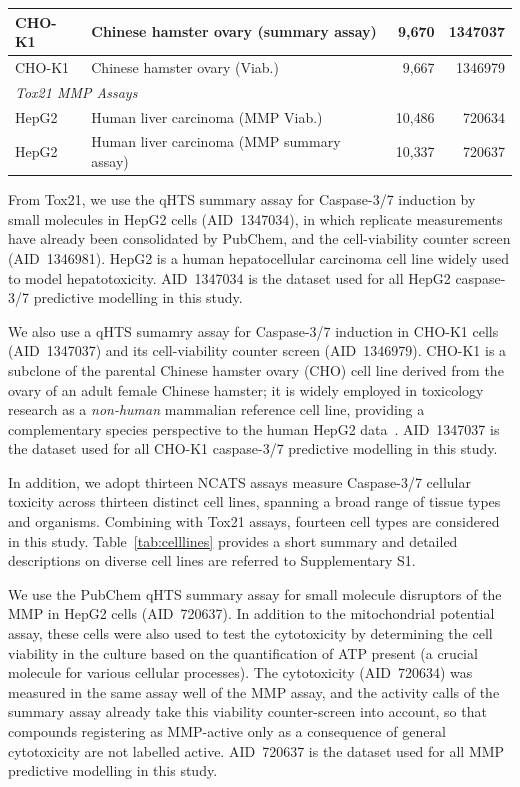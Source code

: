 \documentclass[letterpaper]{article}
\begin{document}
\begin{table}[t!]
\begin{tabular}{llrr}
CHO-K1 & Chinese hamster ovary (summary assay)         & 9{,}670 & 1347037 \\ \hline
CHO-K1 & Chinese hamster ovary (Viab.)                 & 9{,}667 & 1346979 \\[2pt]
\hline
\multicolumn{4}{l}{\textit{Tox21 MMP Assays}} \\
\hline
HepG2 & Human liver carcinoma (MMP Viab.)           & 10{,}486 & 720634 \\ \hline
HepG2 & Human liver carcinoma (MMP summary assay)  & 10{,}337 & 720637 \\
\hline
\end{tabular}
\end{table}

From Tox21, we use the qHTS summary assay for Caspase-3/7 induction by small molecules in HepG2 cells (AID~1347034), in which replicate measurements have already been consolidated by PubChem, and the cell-viability counter screen (AID~1346981). HepG2 is a human hepatocellular carcinoma cell line widely used to model hepatotoxicity. AID~1347034 is the dataset used for all HepG2 caspase-3/7 predictive modelling in this study.


We also use a qHTS sumamry assay for Caspase-3/7 induction in CHO-K1 cells
(AID~1347037) and its cell-viability counter screen (AID~1346979).
CHO-K1 is a subclone of the parental Chinese hamster ovary (CHO) cell
line derived from the ovary of an adult female Chinese hamster; it is
widely employed in toxicology research as a \emph{non-human} mammalian
reference cell line, providing a complementary species perspective to
the human HepG2 data~\cite{ATCC_CHOK1}. AID~1347037 is the dataset used for all CHO-K1 caspase-3/7 predictive modelling in this study.

In addition, we adopt thirteen NCATS assays measure Caspase-3/7 cellular toxicity across thirteen distinct cell lines, spanning a broad range of tissue types and organisms. Combining with Tox21 assays, fourteen cell types are considered in this study. Table~\ref{tab:celllines} provides a short summary and detailed descriptions on diverse cell lines are referred to Supplementary S1.

We use the PubChem qHTS summary assay for small molecule disruptors of the MMP in HepG2 cells (AID~720637). In addition to the mitochondrial potential assay, these cells were also used to test the cytotoxicity by determining the cell viability in the culture based on the quantification of ATP present (a crucial molecule for various cellular processes). The cytotoxicity (AID~720634) was measured in the same assay well of the MMP assay, and the activity calls of the summary assay already take this viability counter-screen into account, so that compounds registering as MMP-active only as a consequence of general cytotoxicity are not labelled active. AID~720637 is the dataset used for all MMP predictive modelling in this study.
\end{document}
